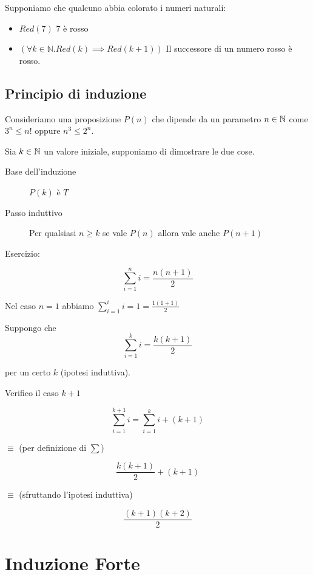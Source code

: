 Supponiamo che qualcuno abbia colorato i numeri naturali:

\begin{itemize}

\item $Red(7)$ 7 è rosso
\item $(\forall k \in \mathbb{N} . Red(k) \implies Red(k+1))$ Il successore di un numero rosso è rosso.

\end{itemize}


\subsection{Principio di induzione}

Consideriamo una proposizione $P(n)$ che dipende da un parametro $n \in \mathbb{N}$ come $3^n \leq n!$ oppure $n^3 \leq 2^n$. 

Sia $k \in \mathbb{N}$ un valore iniziale, supponiamo di dimostrare le due cose.

\begin{description}
\item [Base dell'induzione] $P(k)$ è $T$
\item [Passo induttivo] Per qualsiasi $n \geq k$ se vale $P(n)$ allora vale anche $P(n+1)$
\end{description}



Esercizio:

$$\displaystyle \sum_{i=1}^{n}{i} = \frac{n(n+1)}{2}$$

Nel caso $n = 1$ abbiamo $\displaystyle \sum_{i=1}^{i}{i} = 1 = \frac{1(1+1)}{2}$

Suppongo che 
$$\displaystyle \sum_{i=1}^{k}{i} = \frac{k(k+1)}{2}$$

per un certo $k$ (ipotesi induttiva).

Verifico il caso $k + 1$

$$
\displaystyle \sum_{i=1}^{k+1}{i} = \displaystyle \sum_{i=1}^{k}{i} + (k+1) 
$$ 

$\equiv$ (per definizione di $\sum$)

$$ \displaystyle \frac{k(k+1)}{2} + (k+1)$$

$\equiv$ (sfruttando l'ipotesi induttiva)

$$\displaystyle \frac{(k+1)(k+2)}{2}$$


\section{Induzione Forte}

